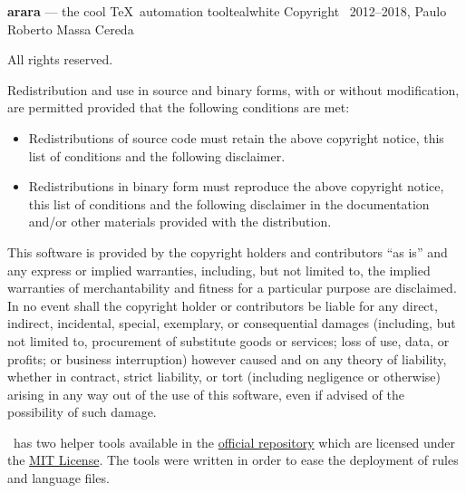 \documentclass[a4paper,twoside,12pt]{memoir}
\begin{document}
\begin{messagebox}{{{\selectfont\bfseries arara} --- the cool \TeX\ automation tool}}{teal}{\icinfo}{white}
Copyright \textcopyright\ 2012--2018, Paulo Roberto Massa Cereda

All rights reserved.

\vspace{1em}

Redistribution and use in source and binary forms, with or without modification, are permitted provided that the following conditions are met:

\begin{itemize}
\item Redistributions of source code must retain the above copyright notice, this list of conditions and the following disclaimer.
\item Redistributions in binary form must reproduce the above copyright notice, this list of conditions and the following disclaimer in the documentation and/or other materials provided with the distribution.
\end{itemize}

This software is provided by the copyright holders and contributors ``as is'' and any express or implied warranties, including, but not limited to, the implied warranties of merchantability and fitness for a particular purpose are disclaimed. In no event shall the copyright holder or contributors be liable for any direct, indirect, incidental, special, exemplary, or consequential damages (including, but not limited to, procurement of substitute goods or services; loss of use, data, or profits; or business interruption) however caused and on any theory of liability, whether in contract, strict liability, or tort (including negligence or otherwise) arising in any way out of the use of this software, even if advised of the possibility of such damage.
\end{messagebox}

\arara\ has two helper tools available in the \href{https://github.com/cereda/arara}{official repository} which are licensed under the \href{http://opensource.org/licenses/MIT}{MIT License}. The tools were written in order to ease the deployment of rules and language files.
\end{document}
